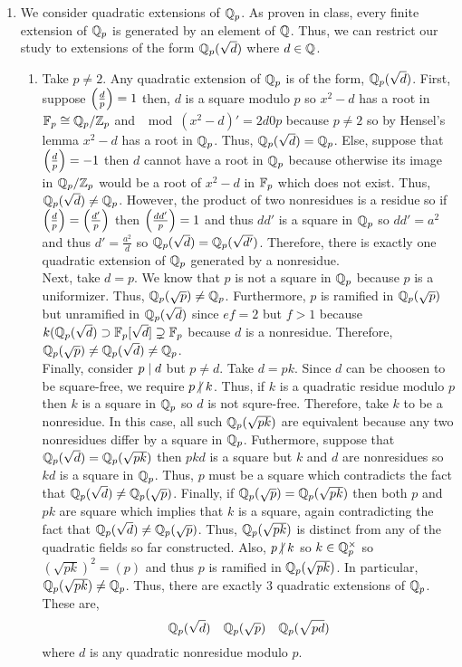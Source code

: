 \documentclass[12pt]{extarticle}
\begin{document}
\begin{enumerate}
\item We consider quadratic extensions of $\mathbb{Q}_p$. As proven in class, every finite extension of $\mathbb{Q}_p$ is generated by an element of $\mathbb{Q}$. Thus, we can restrict our study to extensions of the form $\mathbb{Q}_p(\sqrt{d})$ where $d \in \mathbb{Q}$. 
\begin{enumerate}
\item Take $p \neq 2$. Any quadratic extension of $\mathbb{Q}_p$ is of the form, $\mathbb{Q}_p(\sqrt{d})$. First, suppose $\left(\frac{d}{p} \right) = 1$ then, $d$ is a square modulo $p$ so $x^2 - d$ has a root in $\mathbb{F}_{p} \cong \mathbb{Q}_p/\mathbb{Z}_p$ and $\mod{(x^2 - d)' = 2d}{0}{p}$ because $p \neq 2$ so by Hensel's lemma $x^2 - d$ has a root in $\mathbb{Q}_p$. Thus, $\mathbb{Q}_p(\sqrt{d}) = \mathbb{Q}_p$. Else, suppose that $\left(\frac{d}{p} \right) = -1$ then $d$ cannot have a root in $\mathbb{Q}_p$ because otherwise its image in $\mathbb{Q}_p/\mathbb{Z}_p$ would be a root of $x^2 - d$ in $\mathbb{F}_{p}$ which does not exist. Thus, $\mathbb{Q}_p(\sqrt{d}) \neq \mathbb{Q}_p$. However, the product of two nonresidues is a residue so if $\left(\frac{d}{p} \right) = \left(\frac{d'}{p} \right)$ then $\left(\frac{dd'}{p} \right) = 1$ and thus $dd'$ is a square in $\mathbb{Q}_p$ so $dd' = a^2$ and thus $d' = \frac{a^2}{d}$ so $\mathbb{Q}_p(\sqrt{d}) = \mathbb{Q}_p(\sqrt{d'})$. Therefore, there is exactly one quadratic extension of $\mathbb{Q}_p$ generated by a nonresidue. \bigskip \\
Next, take $d = p$. We know that $p$ is not a square in $\mathbb{Q}_p$ because $p$ is a uniformizer. Thus, $\mathbb{Q}_p(\sqrt{p}) \neq \mathbb{Q}_p$. Furthermore, $p$ is ramified in $\mathbb{Q}_p(\sqrt{p})$ but unramified in $\mathbb{Q}_p(\sqrt{d})$ since $ef = 2$ but $f > 1$ because $k(\mathbb{Q}_p(\sqrt{d}) \supset \mathbb{F}_{p}[\sqrt{d}] \supsetneq \mathbb{F}_{p}$ because $d$ is a nonresidue. Therefore, $\mathbb{Q}_p(\sqrt{p}) \neq \mathbb{Q}_p(\sqrt{d}) \neq \mathbb{Q}_p$. \bigskip \\
Finally, consider $p \mid d$ but $p \neq d$. Take $d = p k$. Since $d$ can be choosen to be square-free, we require $p \ndivides k$. Thus, if $k$ is a quadratic residue modulo $p$ then $k$ is a square in $\mathbb{Q}_p$ so $d$ is not squre-free. Therefore, take $k$ to be a nonresidue. In this case, all such $\mathbb{Q}_p(\sqrt{p k})$ are equivalent because any two nonresidues differ by a square in $\mathbb{Q}_p$. Futhermore, suppose that $\mathbb{Q}_p(\sqrt{d}) = \mathbb{Q}_p(\sqrt{p k})$ then $p k d$ is a square but $k$ and $d$ are nonresidues so $k d$ is a square in $\mathbb{Q}_p$. Thus, $p$ must be a square which contradicts the fact that $\mathbb{Q}_p(\sqrt{d}) \neq \mathbb{Q}_p(\sqrt{p})$. Finally, if $\mathbb{Q}_p(\sqrt{p}) = \mathbb{Q}_p(\sqrt{p k})$ then both $p$ and $pk$ are square which implies that $k$ is a square, again contradicting the fact that $\mathbb{Q}_p(\sqrt{d}) \neq \mathbb{Q}_p(\sqrt{p})$. Thus, $\mathbb{Q}_p(\sqrt{pk})$ is distinct from any of the quadratic fields so far constructed. Also, $p \ndivides k$ so $k \in \mathbb{Q}_p^\times$ so $(\sqrt{pk})^2 = (p)$ and thus $p$ is ramified in $\mathbb{Q}_p(\sqrt{pk})$. In particular, $\mathbb{Q}_p(\sqrt{pk}) \neq \mathbb{Q}_p$. Thus, there are exactly $3$ quadratic extensions of $\mathbb{Q}_p$. These are,
\[ \mathbb{Q}_p(\sqrt{d}) \quad \mathbb{Q}_p(\sqrt{p}) \quad \mathbb{Q}_p(\sqrt{pd}) \]
where $d$ is any quadratic nonresidue modulo $p$. 
 

\end{enumerate}
\end{enumerate}
\end{document}
